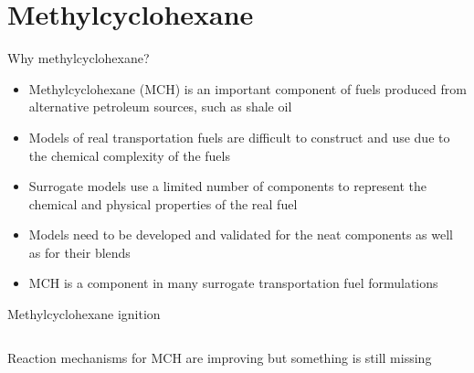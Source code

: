 \documentclass{beamer}
\begin{document}
\section{Methylcyclohexane}

\begin{frame}{Why methylcyclohexane?}
    \begin{itemize}
        \item Methylcyclohexane (MCH) is an important component of fuels
            produced from alternative petroleum sources, such as shale oil
        \item Models of real transportation fuels are difficult to 
            construct and use due to the chemical complexity of the fuels
        \item Surrogate models use a limited number of components to 
            represent the chemical and physical properties of the real fuel
        \item Models need to be developed and validated for the neat 
            components as well as for their blends
        \item MCH is a component in many surrogate transportation fuel
            formulations
    \end{itemize}
\end{frame}

\begin{frame}{Methylcyclohexane ignition}
    \begin{columns}
    \end{columns}
    \begin{center}
        Reaction mechanisms for MCH are improving but something is still
        missing
    \end{center}
\end{frame}
\end{document}
